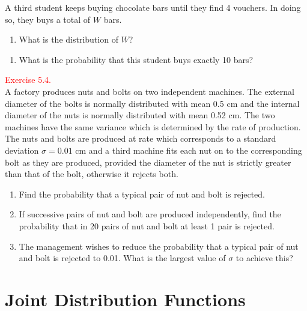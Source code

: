 \documentclass[
]{book}
\providecommand{\tightlist}{%
  \setlength{\itemsep}{0pt}\setlength{\parskip}{0pt}}
\begin{document}
A third student keeps buying chocolate bars until they find 4 vouchers. In
doing so, they buys a total of \(W\) bars.

\begin{enumerate}
\def\labelenumi{(\roman{enumi})}
\tightlist
\item
  What is the distribution of \(W\)?\\
\end{enumerate}

\begin{enumerate}
\def\labelenumi{(\alph{enumi})}
\setcounter{enumi}{9}
\tightlist
\item
  What is the probability that this student buys exactly 10 bars?\\
\end{enumerate}

\hfill\break

\leavevmode{}%
\textcolor{red}{Exercise 5.4.}\\
A factory produces nuts and bolts on two independent machines. The external diameter of the bolts is normally distributed with mean 0.5 cm and the internal diameter of the nuts is normally distributed with mean 0.52 cm. The two machines have the same variance which is determined by the rate of production. The nuts and bolts are produced at rate which corresponds to a standard deviation \(\sigma=0.01\) cm and a third machine fits each nut on to the corresponding bolt as they are produced, provided the diameter of the nut is strictly greater than that of the bolt, otherwise it rejects both.

\begin{enumerate}
\def\labelenumi{(\alph{enumi})}
\tightlist
\item
  Find the probability that a typical pair of nut and bolt is rejected.\\
\item
  If successive pairs of nut and bolt are produced independently, find the probability that in 20 pairs of nut and bolt at least 1 pair is rejected.\\
\item
  The management wishes to reduce the probability that a typical pair of nut and bolt is rejected to 0.01. What is the largest value of \(\sigma\) to achieve this?
\end{enumerate}

\hfill\break

\hypertarget{jointdis}{%
\chapter{Joint Distribution Functions}\label{jointdis}}
\end{document}
